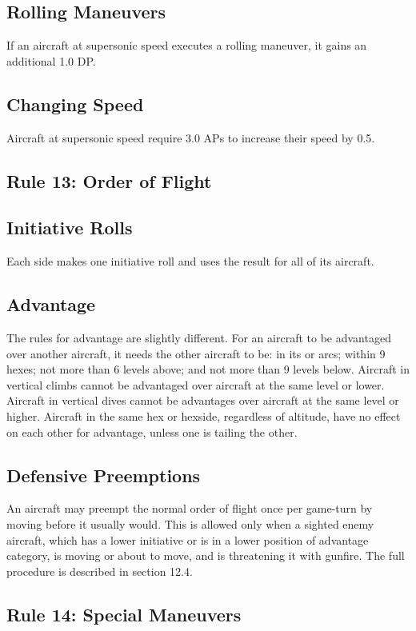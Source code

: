 \documentclass[10pt]{article}
\begin{document}
\subsection{Rolling Maneuvers} If an aircraft at supersonic speed executes a rolling maneuver, it gains an additional 1.0 DP.

\subsection{Changing Speed} Aircraft at supersonic speed require 3.0 APs to increase their speed by 0.5.

\subsection{Rule 13: Order of Flight}

\subsection{Initiative Rolls} Each side makes one initiative roll and uses the result for all of its aircraft.

\subsection{Advantage} The rules for advantage are slightly different. For an aircraft to be advantaged over another aircraft, it needs the other aircraft to be: in its  or  arcs; within 9 hexes; not more than 6 levels above; and not more than 9 levels below. Aircraft in vertical climbs cannot be advantaged over aircraft at the same level or lower. Aircraft in vertical dives cannot be advantages over aircraft at the same level or higher. Aircraft in the same hex or hexside, regardless of altitude, have no effect on each other for advantage, unless one is tailing the other.

\subsection{Defensive Preemptions} An aircraft may preempt the normal order of flight once per game-turn by moving before it usually would. This is allowed only when a sighted enemy aircraft, which has a lower initiative or is in a lower position of advantage category, is moving or about to move, and is threatening it with gunfire. The full procedure is described in section 12.4.

\subsection{Rule 14: Special Maneuvers}
\end{document}
